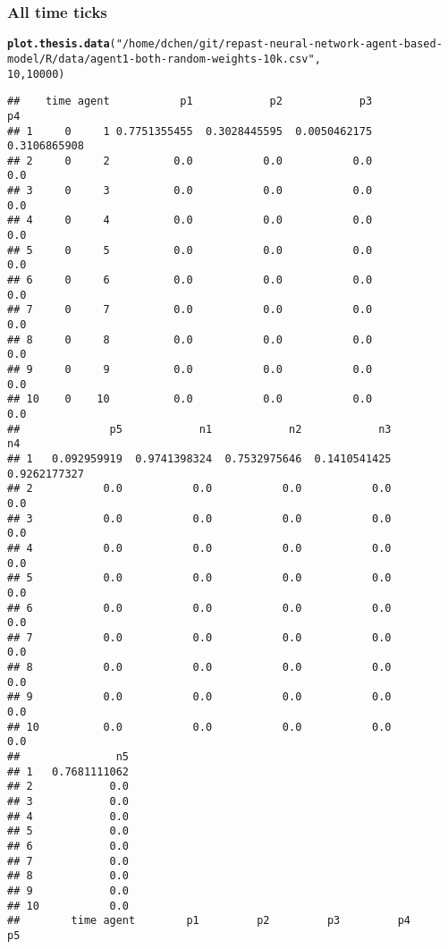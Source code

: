 \documentclass{article}\usepackage[]{graphicx}\usepackage[]{color}
\makeatletter
\newcommand{\hlnum}[1]{\textcolor[rgb]{0.686,0.059,0.569}{#1}}%
\newcommand{\hlstr}[1]{\textcolor[rgb]{0.192,0.494,0.8}{#1}}%
\newcommand{\hlstd}[1]{\textcolor[rgb]{0.345,0.345,0.345}{#1}}%
\newcommand{\hlkwd}[1]{\textcolor[rgb]{0.737,0.353,0.396}{\textbf{#1}}}%
\newenvironment{kframe}{%
 \def\at@end@of@kframe{}%
 \ifinner\ifhmode%
  \def\at@end@of@kframe{\end{minipage}}%
  \begin{minipage}{\columnwidth}%
 \fi\fi%
 \def\FrameCommand##1{\hskip\@totalleftmargin \hskip-\fboxsep
 \colorbox{shadecolor}{##1}\hskip-\fboxsep
     \hskip-\linewidth \hskip-\@totalleftmargin \hskip\columnwidth}%
 \MakeFramed {\advance\hsize-\width
   \@totalleftmargin\z@ \linewidth\hsize
   \@setminipage}}%
 {\par\unskip\endMakeFramed%
 \at@end@of@kframe}
\newenvironment{knitrout}{}{} %
\makeatother
\begin{document}
\newpage
\subsubsection{All time ticks}
\begin{knitrout}
\color{fgcolor}\begin{kframe}
\begin{alltt}
\hlkwd{plot.thesis.data}\hlstd{(}\hlstr{"/home/dchen/git/repast-neural-network-agent-based-model/R/data/agent1-both-random-weights-10k.csv"}\hlstd{,}
    \hlnum{10}\hlstd{,} \hlnum{10000}\hlstd{)}
\end{alltt}
\begin{verbatim}
##    time agent           p1            p2            p3            p4
## 1     0     1 0.7751355455  0.3028445595  0.0050462175  0.3106865908
## 2     0     2          0.0           0.0           0.0           0.0
## 3     0     3          0.0           0.0           0.0           0.0
## 4     0     4          0.0           0.0           0.0           0.0
## 5     0     5          0.0           0.0           0.0           0.0
## 6     0     6          0.0           0.0           0.0           0.0
## 7     0     7          0.0           0.0           0.0           0.0
## 8     0     8          0.0           0.0           0.0           0.0
## 9     0     9          0.0           0.0           0.0           0.0
## 10    0    10          0.0           0.0           0.0           0.0
##              p5            n1            n2            n3            n4
## 1   0.092959919  0.9741398324  0.7532975646  0.1410541425  0.9262177327
## 2           0.0           0.0           0.0           0.0           0.0
## 3           0.0           0.0           0.0           0.0           0.0
## 4           0.0           0.0           0.0           0.0           0.0
## 5           0.0           0.0           0.0           0.0           0.0
## 6           0.0           0.0           0.0           0.0           0.0
## 7           0.0           0.0           0.0           0.0           0.0
## 8           0.0           0.0           0.0           0.0           0.0
## 9           0.0           0.0           0.0           0.0           0.0
## 10          0.0           0.0           0.0           0.0           0.0
##               n5
## 1   0.7681111062
## 2            0.0
## 3            0.0
## 4            0.0
## 5            0.0
## 6            0.0
## 7            0.0
## 8            0.0
## 9            0.0
## 10           0.0
##        time agent        p1         p2         p3         p4         p5

\end{verbatim}
\end{kframe}
\end{knitrout}
\end{document}
